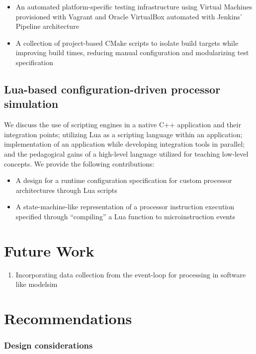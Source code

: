 \begin{itemize}
    \item An automated platform-specific testing infrastructure using Virtual Machines provisioned with Vagrant and Oracle VirtualBox automated with Jenkins' Pipeline architecture
    \item A collection of project-based CMake scripts to isolate build targets while improving build times, reducing manual configuration and modularizing test specification
\end{itemize}

\subsection{Lua-based configuration-driven processor simulation}

We discuss the use of scripting engines in a native C++ application and their integration points; utilizing Lua as a scripting language within an application; implementation of an application while developing integration tools in parallel; and the pedagogical gains of a high-level language utilized for teaching low-level concepts. We provide the following contributions:

\begin{itemize}
    \item A design for a runtime configuration specification for custom processor architectures through Lua scripts
    \item A state-machine-like representation of a processor instruction execution specified through ``compiling'' a Lua function to microinstruction events
\end{itemize}


\section{Future Work}
\label{sec:future-work}

\begin{enumerate}
    \item Incorporating data collection from the event-loop for processing in software like modelsim
\end{enumerate}

\section{Recommendations}

\subsubsection{Design considerations\cite{Nakamura2013}}

